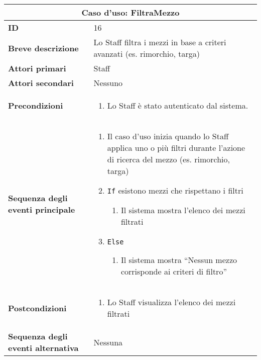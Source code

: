 \documentclass[a4paper]{report}
\begin{document}
\clearpage
\begin{table}[H]
\vspace*{-0cm}
\renewcommand{\arraystretch}{1.9}
\begin{tabular}{|p{3.9cm}|p{9.9cm}|}
\hline
\multicolumn{2}{|c|}{\textbf{Caso d’uso: FiltraMezzo}} \\ \hline
	\textbf{ID} & 16 \\ \hline
	\textbf{Breve descrizione} & Lo Staff filtra i mezzi in base a criteri avanzati (es. rimorchio, targa) \\ \hline
	\textbf{Attori primari} & Staff \\ \hline
	\textbf{Attori secondari} & Nessuno \\ \hline
	\textbf{Precondizioni} & \begin{enumerate}[label=\arabic*.,leftmargin=14pt,labelsep=0.5em,topsep=0pt,partopsep=0pt,parsep=0pt,itemsep=0pt]
        \item Lo Staff è stato autenticato dal sistema.
    \end{enumerate} \\ \hline
	\textbf{Sequenza degli eventi principale} & 
\begin{enumerate}[leftmargin=14pt,label=\arabic*.,labelsep=0.5em,topsep=0pt,partopsep=0pt,parsep=0pt,itemsep=0pt]
    \item Il caso d'uso inizia quando lo Staff applica uno o più filtri durante l'azione di ricerca del mezzo (es. rimorchio, targa)
    \item \texttt{If} esistono mezzi che rispettano i filtri
    \begin{enumerate}[label=\arabic{enumi}.\arabic*.,leftmargin=22pt,labelsep=0.5em,topsep=0pt,partopsep=0pt,parsep=0pt,itemsep=0pt]
        \item Il sistema mostra l’elenco dei mezzi filtrati
    \end{enumerate}
    \item \texttt{Else}
    \begin{enumerate}[label=\arabic{enumi}.\arabic*.,leftmargin=22pt,labelsep=0.5em,topsep=0pt,partopsep=0pt,parsep=0pt,itemsep=0pt]
        \item Il sistema mostra “Nessun mezzo corrisponde ai criteri di filtro”
    \end{enumerate}
\end{enumerate}\\ \hline
    	\textbf{Postcondizioni} & \begin{enumerate}[label=\arabic*.,leftmargin=14pt,labelsep=0.5em,topsep=0pt,partopsep=0pt,parsep=0pt,itemsep=0pt]
        \item Lo Staff visualizza l’elenco dei mezzi filtrati
        \end{enumerate} \\ \hline
    	\textbf{Sequenza degli eventi alternativa} & Nessuna \\ \hline
\end{tabular}
\end{table}
\end{document}
